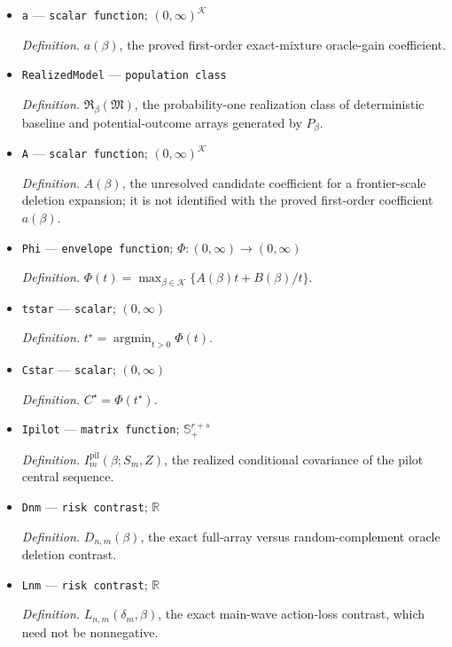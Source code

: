 \documentclass{article}
\begin{document}
\begin{itemize}
  \item \texttt{a} --- \texttt{scalar function}; \((0,\infty)^{\mathcal K}\)
  \par\smallskip\noindent\emph{Definition.} \(a(\beta)\), the proved first-order exact-mixture oracle-gain coefficient.
  \item \texttt{RealizedModel} --- \texttt{population class}
  \par\smallskip\noindent\emph{Definition.} \(\mathfrak R_{\beta}(\mathfrak M)\), the probability-one realization class of deterministic baseline and potential-outcome arrays generated by \(P_{\beta}\).
  \item \texttt{A} --- \texttt{scalar function}; \((0,\infty)^{\mathcal K}\)
  \par\smallskip\noindent\emph{Definition.} \(A(\beta)\), the unresolved candidate coefficient for a frontier-scale deletion expansion; it is not identified with the proved first-order coefficient \(a(\beta)\).
  \item \texttt{Phi} --- \texttt{envelope function}; \(\Phi:(0,\infty)\to(0,\infty)\)
  \par\smallskip\noindent\emph{Definition.} \(\Phi(t)=\max_{\beta\in\mathcal K}\{A(\beta)t+B(\beta)/t\}\).
  \item \texttt{tstar} --- \texttt{scalar}; \((0,\infty)\)
  \par\smallskip\noindent\emph{Definition.} \(t^{\star}=\operatorname*{argmin}_{t>0}\Phi(t)\).
  \item \texttt{Cstar} --- \texttt{scalar}; \((0,\infty)\)
  \par\smallskip\noindent\emph{Definition.} \(C^{\star}=\Phi(t^{\star})\).
  \item \texttt{Ipilot} --- \texttt{matrix function}; \(\mathbb S_+^{r+s}\)
  \par\smallskip\noindent\emph{Definition.} \(I_m^{\mathrm{pil}}(\beta;S_m,Z)\), the realized conditional covariance of the pilot central sequence.
  \item \texttt{Dnm} --- \texttt{risk contrast}; \(\mathbb R\)
  \par\smallskip\noindent\emph{Definition.} \(D_{n,m}(\beta)\), the exact full-array versus random-complement oracle deletion contrast.
  \item \texttt{Lnm} --- \texttt{risk contrast}; \(\mathbb R\)
  \par\smallskip\noindent\emph{Definition.} \(L_{n,m}(\delta_m,\beta)\), the exact main-wave action-loss contrast, which need not be nonnegative.
\end{itemize}
\end{document}

